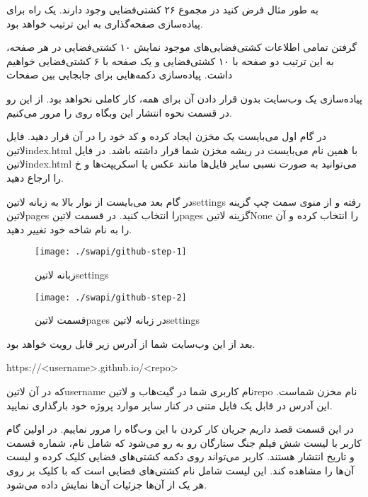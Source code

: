 به طور مثال فرض کنید در مجموع ۲۶ کشتی‌فضایی وجود دارند. یک راه برای پیاده‌سازی صفحه‌گذاری به این ترتیب خواهد بود.

 گرفتن تمامی اطلاعات کشتی‌فضایی‌های موجود
 نمایش ۱۰ کشتی‌فضایی در هر صفحه، به این ترتیب دو صفحه با ۱۰ کشتی‌فضایی و یک صفحه با ۶ کشتی‌فضایی خواهیم داشت.
 پیاده‌سازی دکمه‌هایی برای جابجایی بین صفحات

پیاده‌سازی یک وب‌سایت بدون قرار دادن آن برای همه، کار کاملی نخواهد بود. از این رو در قسمت نحوه انتشار این وبگاه روی  را مرور می‌کنیم.

در گام اول می‌بایست یک مخزن ایجاد کرده و کد خود را در آن قرار دهید. فایل ‌لاتین{index.html} با همین نام می‌بایست در ریشه مخزن شما قرار داشته باشد.
در فایل ‌لاتین{index.html} می‌توانید به صورت نسبی سایر فایل‌ها مانند عکس یا اسکریپت‌ها و ‌خ را ارجاع دهید.

در گام بعد می‌بایست از نوار بالا به زبانه ‌لاتین{settings} رفته و از منوی سمت چپ گزینه ‌لاتین{pages} را انتخاب کنید.
در قسمت ‌لاتین{pages} گزینه ‌لاتین{None} را انتخاب کرده و آن را به نام شاخه خود تغییر دهید.

\begin{figure}[h]
  \centering
  \texttt{[image: ./swapi/github-step-1]}
  \caption{زبانه ‌لاتین{settings}}
\end{figure}

\begin{figure}[h]
  \centering
  \texttt{[image: ./swapi/github-step-2]}
  \caption{قسمت ‌لاتین{pages} در زبانه ‌لاتین{settings}}
\end{figure}

بعد از این وب‌سایت شما از آدرس زیر قابل رویت خواهد بود.

\begin{latin}\begin{center}
https://<username>.github.io/<repo>
\end{center}\end{latin}

که در آن ‌لاتین{username} نام کاربری شما در گیت‌هاب و ‌لاتین{repo} نام مخزن شماست. این آدرس در قابل یک فایل متنی در کنار سایر موارد پروژه خود بارگذاری نمایید.


در این قسمت قصد داریم جریان کار کردن با این وب‌گاه را مرور نماییم.
در اولین گام کاربر با لیست شش فیلم جنگ ستارگان رو به رو می‌شود که شامل
نام، شماره قسمت و تاریخ انتشار هستند.
کاربر می‌تواند روی دکمه کشتی‌های فضایی کلیک کرده و لیست آن‌ها را مشاهده کند.
این لیست شامل نام کشتی‌های فضایی است که با کلیک بر روی هر یک از آن‌ها
جزئیات آن‌ها نمایش داده می‌شود.


